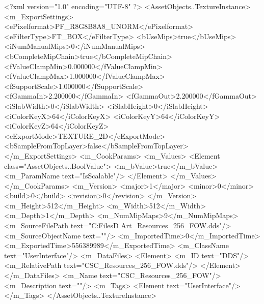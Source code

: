 <?xml version="1.0" encoding="UTF-8" ?>
<AssetObjects..TextureInstance>
	<m_ExportSettings>
		<ePixelformat>PF_R8G8B8A8_UNORM</ePixelformat>
		<eFilterType>FT_BOX</eFilterType>
		<bUseMips>true</bUseMips>
		<iNumManualMips>0</iNumManualMips>
		<bCompleteMipChain>true</bCompleteMipChain>
		<fValueClampMin>0.000000</fValueClampMin>
		<fValueClampMax>1.000000</fValueClampMax>
		<fSupportScale>1.000000</fSupportScale>
		<fGammaIn>2.200000</fGammaIn>
		<fGammaOut>2.200000</fGammaOut>
		<iSlabWidth>0</iSlabWidth>
		<iSlabHeight>0</iSlabHeight>
		<iColorKeyX>64</iColorKeyX>
		<iColorKeyY>64</iColorKeyY>
		<iColorKeyZ>64</iColorKeyZ>
		<eExportMode>TEXTURE_2D</eExportMode>
		<bSampleFromTopLayer>false</bSampleFromTopLayer>
	</m_ExportSettings>
	<m_CookParams>
		<m_Values>
			<Element class="AssetObjects..BoolValue">
				<m_bValue>true</m_bValue>
				<m_ParamName text="IsScalable"/>
			</Element>
		</m_Values>
	</m_CookParams>
	<m_Version>
		<major>1</major>
		<minor>0</minor>
		<build>0</build>
		<revision>0</revision>
	</m_Version>
	<m_Height>512</m_Height>
	<m_Width>512</m_Width>
	<m_Depth>1</m_Depth>
	<m_NumMipMaps>9</m_NumMipMaps>
	<m_SourceFilePath text="C:\Users\Shadow\Desktop\Working Files\2D Art\Resources\CSC_Resources_256_FOW.dds"/>
	<m_SourceObjectName text=""/>
	<m_ImportedTime>0</m_ImportedTime>
	<m_ExportedTime>556389989</m_ExportedTime>
	<m_ClassName text="UserInterface"/>
	<m_DataFiles>
		<Element>
			<m_ID text="DDS"/>
			<m_RelativePath text="CSC_Resources_256_FOW.dds"/>
		</Element>
	</m_DataFiles>
	<m_Name text="CSC_Resources_256_FOW"/>
	<m_Description text=""/>
	<m_Tags>
		<Element text="UserInterface"/>
	</m_Tags>
</AssetObjects..TextureInstance>

